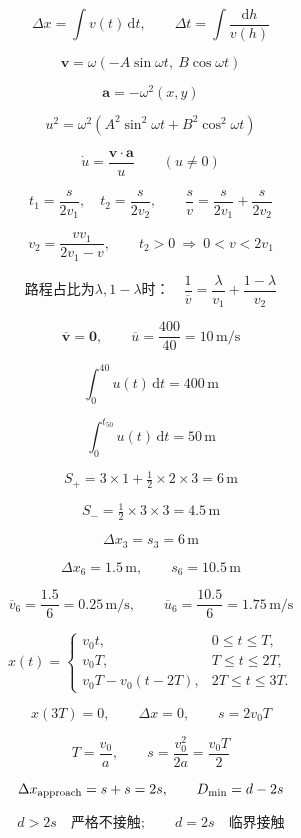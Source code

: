 \documentclass[12pt]{article}
\begin{document}
\[
\Delta x=\int v(t)\,\mathrm dt,\qquad \Delta t=\int\frac{\mathrm dh}{v(h)}
\]

\[
\boldsymbol v=\omega(-A\sin\omega t,\ B\cos\omega t)
\]

\[
\boldsymbol a=-\omega^2(x,y)
\]

\[
u^2=\omega^2(A^2\sin^2\omega t+B^2\cos^2\omega t)
\]

\[
\dot u=\frac{\boldsymbol v\cdot\boldsymbol a}{u}\qquad(u\ne0)
\]

\[
t_1=\frac{s}{2v_1},\quad t_2=\frac{s}{2v_2},\qquad\frac{s}{v}=\frac{s}{2v_1}+\frac{s}{2v_2}
\]

\[
\boxed{v_2=\frac{vv_1}{2v_1-v}},\qquad t_2>0\ \Longrightarrow\ \boxed{0<v<2v_1}
\]

\[
\text{路程占比为}\lambda,1-\lambda\text{时：}\quad\frac1{\overline v}=\frac{\lambda}{v_1}+\frac{1-\lambda}{v_2}
\]

\[
\overline{\boldsymbol v}=\boldsymbol0,\qquad\overline u=\frac{400}{40}=10\,\mathrm{m/s}
\]

\[
\int_0^{40}u(t)\,\mathrm dt=400\,\mathrm m
\]

\[
\int_0^{t_{50}}u(t)\,\mathrm dt=50\,\mathrm m
\]

\[
S_+=3\times1+\tfrac12\times2\times3=6\,\mathrm m
\]

\[
S_-=\tfrac12\times3\times3=4.5\,\mathrm m
\]

\[
\Delta x_3=s_3=6\,\mathrm m
\]

\[
\boxed{\Delta x_6=1.5\,\mathrm m},\qquad \boxed{s_6=10.5\,\mathrm m}
\]

\[
\overline v_6=\frac{1.5}{6}=0.25\,\mathrm{m/s},\qquad\overline u_6=\frac{10.5}{6}=1.75\,\mathrm{m/s}
\]

\[
x(t)=\begin{cases} v_0t,&0\le t\le T,\\ v_0T,&T\le t\le2T,\\ v_0T-v_0(t-2T),&2T\le t\le3T. \end{cases}
\]

\[
x(3T)=0,\qquad\Delta x=0,\qquad s=2v_0T
\]

\[
T=\frac{v_0}{a},\qquad s=\frac{v_0^2}{2a}=\frac{v_0T}{2}
\]

\[
\Delta x_{\rm approach}=s+s=2s,\qquad D_{\min}=d-2s
\]

\[
\boxed{d>2s}\quad\text{严格不接触};\qquad d=2s\quad\text{临界接触}
\]
\end{document}
